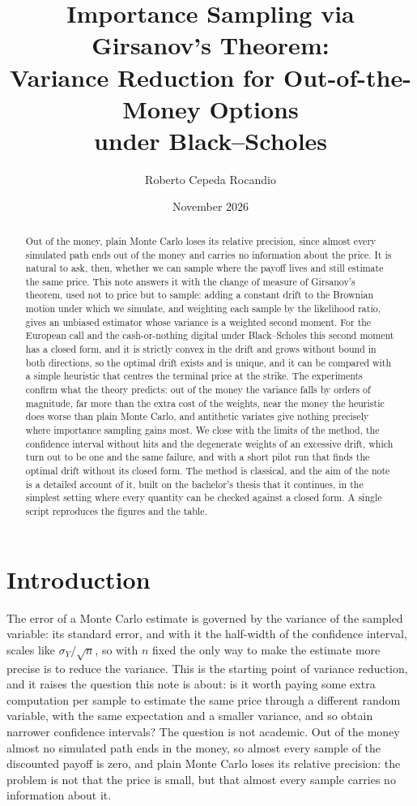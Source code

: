 \documentclass[11pt,a4paper]{article}
\title{Importance Sampling via Girsanov's Theorem:\\
       Variance Reduction for Out-of-the-Money Options\\
       under Black--Scholes}
\author{Roberto Cepeda Rocandio}
\date{November 2026}
\theoremstyle{plain}
\theoremstyle{definition}
\theoremstyle{remark}
\newcommand{\1}{\mathbf{1}}
\begin{document}
\maketitle

\begin{abstract}
Out of the money, plain Monte Carlo loses its relative precision, since almost every simulated path ends out of the money and carries no information about the price. It is natural to ask, then, whether we can sample where the payoff lives and still estimate the same price. This note answers it with the change of measure of Girsanov's theorem, used not to price but to sample: adding a constant drift to the Brownian motion under which we simulate, and weighting each sample by the likelihood ratio, gives an unbiased estimator whose variance is a weighted second moment. For the European call and the cash-or-nothing digital under Black--Scholes this second moment has a closed form, and it is strictly convex in the drift and grows without bound in both directions, so the optimal drift exists and is unique, and it can be compared with a simple heuristic that centres the terminal price at the strike. The experiments confirm what the theory predicts: out of the money the variance falls by orders of magnitude, far more than the extra cost of the weights, near the money the heuristic does worse than plain Monte Carlo, and antithetic variates give nothing precisely where importance sampling gains most. We close with the limits of the method, the confidence interval without hits and the degenerate weights of an excessive drift, which turn out to be one and the same failure, and with a short pilot run that finds the optimal drift without its closed form. The method is classical, and the aim of the note is a detailed account of it, built on the bachelor's thesis that it continues, in the simplest setting where every quantity can be checked against a closed form. A single script reproduces the figures and the table.
\end{abstract}

\section{Introduction}
\label{sec:intro}

The error of a Monte Carlo estimate is governed by the variance of the sampled variable: its standard error, and with it the half-width of the confidence interval, scales like $\sigma_Y/\sqrt n$, so with $n$ fixed the only way to make the estimate more precise is to reduce the variance. This is the starting point of variance reduction, and it raises the question this note is about: is it worth paying some extra computation per sample to estimate the same price through a different random variable, with the same expectation and a smaller variance, and so obtain narrower confidence intervals? The question is not academic. Out of the money almost no simulated path ends in the money, so almost every sample of the discounted payoff is zero, and plain Monte Carlo loses its relative precision: the problem is not that the price is small, but that almost every sample carries no information about it.
\end{document}
